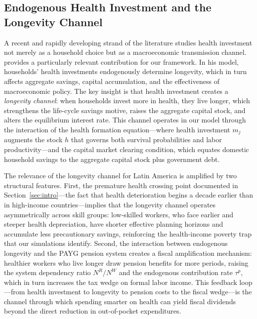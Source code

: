 \documentclass[12pt,a4paper]{article}
\begin{document}
\subsection{Endogenous Health Investment and the Longevity Channel}
\label{subsec:lit_longevity}

A recent and rapidly developing strand of the literature studies health investment not merely as a household choice but as a macroeconomic transmission channel. \citet{Carrasco2026} provides a particularly relevant contribution for our framework. In his model, households' health investments endogenously determine longevity, which in turn affects aggregate savings, capital accumulation, and the effectiveness of macroeconomic policy. The key insight is that health investment creates a \textit{longevity channel}: when households invest more in health, they live longer, which strengthens the life-cycle savings motive, raises the aggregate capital stock, and alters the equilibrium interest rate. This channel operates in our model through the interaction of the health formation equation---where health investment $m_j$ augments the stock $h$ that governs both survival probabilities and labor productivity---and the capital market clearing condition, which equates domestic household savings to the aggregate capital stock plus government debt.

The relevance of the longevity channel for Latin America is amplified by two structural features. First, the premature health crossing point documented in Section~\ref{sec:intro}---the fact that health deterioration begins a decade earlier than in high-income countries---implies that the longevity channel operates asymmetrically across skill groups: low-skilled workers, who face earlier and steeper health depreciation, have shorter effective planning horizons and accumulate less precautionary savings, reinforcing the health-income poverty trap that our simulations identify. Second, the interaction between endogenous longevity and the PAYG pension system creates a fiscal amplification mechanism: healthier workers who live longer draw pension benefits for more periods, raising the system dependency ratio $N^R/N^W$ and the endogenous contribution rate $\tau^p$, which in turn increases the tax wedge on formal labor income. This feedback loop---from health investment to longevity to pension costs to the fiscal wedge---is the channel through which spending smarter on health can yield fiscal dividends beyond the direct reduction in out-of-pocket expenditures.
\end{document}
